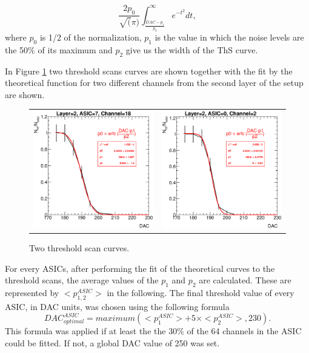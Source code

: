 \documentclass[a4paper,11pt]{article}
\begin{document}
\begin{equation}
\frac{2p_{0}}{\sqrt(\pi)} \int_{\frac{DAC-p_{1}}{p_{2}}}^{\infty} e^{-t^{2}} dt,
\label{eq_S-curve}
\end{equation}
where $p_{0}$ is 1/2 of the normalization, $p_{1}$ is the value in which the noise levels are 
the 50\% of its maximum and $p_{2}$ give us the width of the ThS curve. 

In Figure \ref{scurve_channels} 
two threshold scans curves are shown together with the fit by
the theoretical function for two different channels from the second
layer of the setup are shown.

\begin{figure}[!ht]
  \centering
  \begin{tabular}{ll}
  \includegraphics[width=2.8in]{../figs/commissioning/scurve_chn18_asic7_layer2.eps} & \includegraphics[width=2.8in]{../figs/commissioning/scurve_chn2_asic0_layer2.eps}
  \end{tabular}
\caption{Two threshold scan curves.}
\label{scurve_channels}
\end{figure}


For every ASICs, after performing the fit of the theoretical curves
to the threshold scans, the average values of the   $p_{1}$ and $p_{2}$ are calculated.
These are represented by $<p_{1,2}^{ASIC}>$ in the following.
The final threshold value of every ASIC, in DAC units, was chosen 
using the following formula
\begin{equation}
DAC_{optimal}^{ASIC} =maximum(<p_{1}^{ASIC}> + 5 \times <p_{2}^{ASIC}>,230).
\end{equation}
This formula was applied 
if at least the the 30\% of the 64 channels in the ASIC could be fitted.
If not, a global DAC value of 250 was set.
\end{document}
